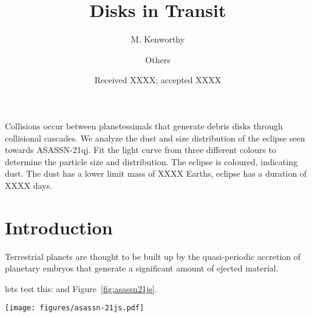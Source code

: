 \documentclass{aa}
\begin{document}
 

   \title{Disks in Transit}

   \author{M. Kenworthy
          \and
          Others
          }


   \date{Received XXXX; accepted XXXX}

 
  \abstract
   {Collisions occur between planetessimals that generate debris disks through collisional cascades.}
   {We analyze the dust and size distribution of the eclipse seen towards ASASSN-21qj.}
   {Fit the light curve from three different colours to determine the particle size and distribution.}
   {The eclipse is coloured, indicating dust.
   The dust has a lower limit mass of XXXX Earths, eclipse has a duration of XXXX days.}
   {}


   \maketitle
%

   \section{Introduction}

Terrestrial planets are thought to be built up by the quasi-periodic accretion of planetary embryos that generate a significant amount of ejected material.

lets test this: \citep{Luger2021} and Figure~\ref{fig:asassn21js}.


\begin{figure*}
   \begin{centering}
   \texttt{[image: figures/asassn-21js.pdf]}
      \caption{ASASSN-21js light curve. Normalised in both bands $g$ and $V$.
              }
              \label{fig:asassn21js}
              \end{centering}
       \end{figure*}
\end{document}
